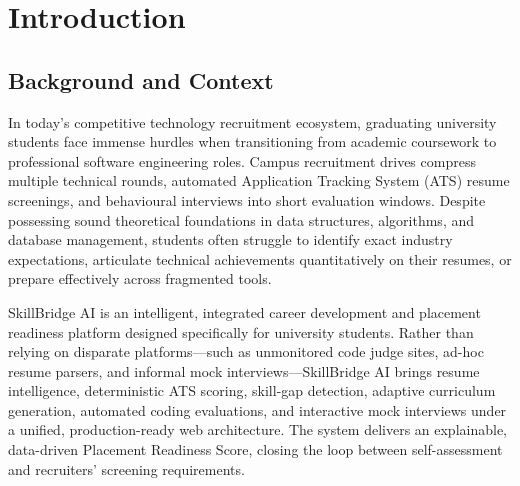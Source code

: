\documentclass[12pt,a4paper,oneside]{report}
\begin{document}
\thispagestyle{empty}
\newpage
\hbox{}
\thispagestyle{empty}
\newpage

\setcounter{page}{3}
\tableofcontents
\newpage

\thispagestyle{empty}
\newpage
\hbox{}
\thispagestyle{empty}
\newpage

\setcounter{page}{5}

\chapter{Introduction}

\section{Background and Context}
In today's competitive technology recruitment ecosystem, graduating university students face immense hurdles when transitioning from academic coursework to professional software engineering roles. Campus recruitment drives compress multiple technical rounds, automated Application Tracking System (ATS) resume screenings, and behavioural interviews into short evaluation windows. Despite possessing sound theoretical foundations in data structures, algorithms, and database management, students often struggle to identify exact industry expectations, articulate technical achievements quantitatively on their resumes, or prepare effectively across fragmented tools.

SkillBridge AI is an intelligent, integrated career development and placement readiness platform designed specifically for university students. Rather than relying on disparate platforms—such as unmonitored code judge sites, ad-hoc resume parsers, and informal mock interviews—SkillBridge AI brings resume intelligence, deterministic ATS scoring, skill-gap detection, adaptive curriculum generation, automated coding evaluations, and interactive mock interviews under a unified, production-ready web architecture. The system delivers an explainable, data-driven Placement Readiness Score, closing the loop between self-assessment and recruiters' screening requirements.
\end{document}
